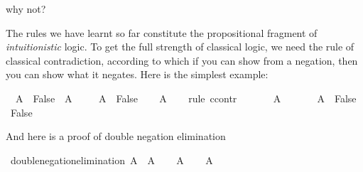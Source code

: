 \begin{isabellebody}
\begin{isamarkuptext}
why not?%
\end{isamarkuptext}\isamarkuptrue%
%
\isamarkuptrue%
%
\begin{isamarkuptext}%
The rules we have learnt so far constitute the propositional fragment of \emph{intuitionistic}
logic. To get the full strength of classical logic, we need the rule of classical contradiction,
according to which if you can show  from a negation, then you can show what it negates.
Here is the simplest example:%
\end{isamarkuptext}\isamarkuptrue%
\isamarkupfalse%
\ {\isachardoublequoteopen}{\isacharparenleft}{\isasymnot}\ A\ {\isasymlongrightarrow}\ False{\isacharparenright}\ {\isasymlongrightarrow}\ A{\isachardoublequoteclose}\isanewline
%
\isadelimproof
%
\endisadelimproof
%
\isatagproof
{}\isamarkupfalse%
\isanewline
\ \ \isamarkupfalse%
\ {\isachardoublequoteopen}{\isasymnot}\ A\ {\isasymlongrightarrow}\ False{\isachardoublequoteclose}\isanewline
\ \ \isamarkupfalse%
\ {\isachardoublequoteopen}A{\isachardoublequoteclose}\isanewline
\ \ \isamarkupfalse%
\ {\isacharparenleft}rule\ ccontr{\isacharparenright}\isanewline
\ \ \ \ \isamarkupfalse%
\ {\isachardoublequoteopen}{\isasymnot}\ A{\isachardoublequoteclose}\isanewline
\ \ \ \ \isamarkupfalse%
\ {\isacharbackquoteopen}{\isasymnot}\ A\ {\isasymlongrightarrow}\ False{\isacharbackquoteclose}\ \isamarkupfalse%
\ {\isachardoublequoteopen}False{\isachardoublequoteclose}\isacommand{{\isachardot}{\isachardot}}\isamarkupfalse%
\isanewline
\ \ \isamarkupfalse%
\isanewline
{}\isamarkupfalse%
%
\endisatagproof
{\isafoldproof}%
%
\isadelimproof
%
\endisadelimproof
%
\begin{isamarkuptext}%
And here is a proof of double negation elimination%
\end{isamarkuptext}\isamarkuptrue%
\isamarkupfalse%
\ double{\isacharunderscore}negation{\isacharunderscore}elimination{\isacharcolon}\ {\isachardoublequoteopen}{\isasymnot}{\isasymnot}A\ {\isasymlongrightarrow}\ A{\isachardoublequoteclose}\isanewline
%
\isadelimproof
%
\endisadelimproof
%
\isatagproof
{}\isamarkupfalse%
\isanewline
\ \ \isamarkupfalse%
\ {\isachardoublequoteopen}{\isasymnot}{\isasymnot}A{\isachardoublequoteclose}\isanewline
\ \ \isamarkupfalse%
\ {\isachardoublequoteopen}A{\isachardoublequoteclose}\isanewline

\end{isabellebody}
